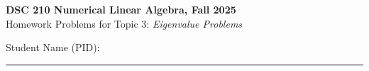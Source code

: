 \documentclass[11pt,letterpaper]{article}
\begin{document}
\pagestyle{plain}


 
\begin{center}
\textbf{\Large DSC 210 Numerical Linear Algebra, Fall 2025} \\ \bigskip
\large{Homework Problems for Topic 3: \textit{Eigenvalue Problems}} \\  \bigskip
\begin{flushleft}
    \large{Student Name (PID):}
\end{flushleft}
\end{center}
\vspace{-4mm}
\rule{\linewidth}{0.1mm}

\bigskip
\end{document}
